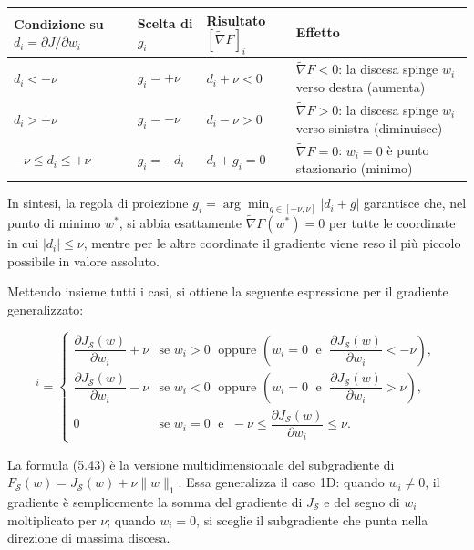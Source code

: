 \documentclass[italian, a4paper, twoside, binding=6mm]{sapthesis}
\begin{document}
{\small
\setlength{\tabcolsep}{4pt}
\renewcommand{\arraystretch}{1.3}
\begin{center}
\begin{tabular}{>{\raggedright\arraybackslash}p{}
                >{\raggedright\arraybackslash}p{}
                >{\raggedright\arraybackslash}p{}
                >{\raggedright\arraybackslash}p{}}
\toprule
Condizione su $d_i = \partial J/\partial w_i$ &
Scelta di $g_i$ &
Risultato $[\widetilde{\nabla}F]_i$ &
Effetto \\
\midrule
$d_i < -\nu$ &
$g_i = +\nu$ &
$d_i + \nu < 0$ &
$\widetilde{\nabla}F < 0$: la discesa spinge $w_i$ verso destra (aumenta) \\
$d_i > +\nu$ &
$g_i = -\nu$ &
$d_i - \nu > 0$ &
$\widetilde{\nabla}F > 0$: la discesa spinge $w_i$ verso sinistra (diminuisce) \\
$-\nu \leq d_i \leq +\nu$ &
$g_i = -d_i$ &
$d_i + g_i = 0$ &
$\widetilde{\nabla}F = 0$: $w_i = 0$ è punto stazionario (minimo) \\
\bottomrule
\end{tabular}
\end{center}
}

In sintesi, la regola di proiezione \(g_i = \arg\min_{g \in [-\nu,\nu]} |d_i + g|\) garantisce che, nel punto di minimo \(w^*\), si abbia esattamente \(\widetilde{\nabla}F(w^*) = 0\) per tutte le coordinate in cui \(|d_i| \le \nu\), mentre per le altre coordinate il gradiente viene reso il più piccolo possibile in valore assoluto.

Mettendo insieme tutti i casi, si ottiene la seguente espressione per il
gradiente generalizzato:

\vspace*{-\baselineskip}
\begin{equation}
[\widetilde{\nabla} F_{\mathcal{S}}(w)]^i =
\begin{cases}
\dfrac{\partial J_{\mathcal{S}}(w)}{\partial w_i} + \nu
& \text{se } w_i > 0 \;\text{ oppure } \left( w_i = 0 \;\text{ e }\; \dfrac{\partial J_{\mathcal{S}}(w)}{\partial w_i} < -\nu \right), \\[12pt]
\dfrac{\partial J_{\mathcal{S}}(w)}{\partial w_i} - \nu
& \text{se } w_i < 0 \;\text{ oppure } \left( w_i = 0 \;\text{ e }\; \dfrac{\partial J_{\mathcal{S}}(w)}{\partial w_i} > \nu \right), \\[12pt]
0
& \text{se } w_i = 0 \;\text{ e }\; -\nu \leq \dfrac{\partial J_{\mathcal{S}}(w)}{\partial w_i} \leq \nu.
\end{cases}
\tag{5.43}
\end{equation}
\vspace*{-\baselineskip}
\begin{notebox}
  La formula (5.43) è la versione multidimensionale del subgradiente di
  $F_{\mathcal{S}}(w) = J_{\mathcal{S}}(w) + \nu\|w\|_1$. Essa generalizza
  il caso 1D: quando $w_i \neq 0$, il gradiente è semplicemente la somma
  del gradiente di $J_{\mathcal{S}}$ e del segno di $w_i$ moltiplicato per $\nu$;
  quando $w_i = 0$, si sceglie il subgradiente che punta nella direzione di
  massima discesa.
\end{notebox}
\end{document}
